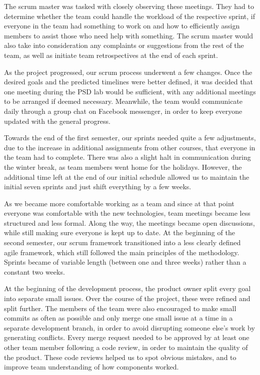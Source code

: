 \documentclass{l3proj}
\begin{document}
 The scrum master was tasked with closely observing these meetings. They had
  to determine whether the team could handle the workload of the respective
  sprint, if everyone in the team had something to work on and how to efficiently
  assign members to assist those who need help with something. The scrum
  master would also take into consideration any complaints or suggestions from
  the rest of the team, as well as initiate team retrospectives at the end of
  each sprint.

 As the project progressed, our scrum process underwent a few changes. Once
 the desired goals and the predicted timelines were better defined, it was
 decided that one meeting during the PSD lab would be sufficient, with any
 additional meetings to be arranged if deemed necessary. Meanwhile, the team
 would communicate daily through a group chat on Facebook messenger, in order
 to keep everyone updated with the general progress.

Towards the end of the first semester, our sprints needed quite a few
 adjustments, due to the increase in additional assignments from other
 courses, that everyone in the team had to complete. There was also a
 slight halt in communication during the winter break, as team members
 went home for the holidays. However, the additional time left at the
 end of our initial schedule allowed us to maintain the initial seven
 sprints and just shift everything by a few weeks.

As we became more comfortable working as a team and since at that
 point everyone was comfortable with the new technologies, team
 meetings became less structured and less formal. Along the way,
 the meetings became open discussions, while still making sure
 everyone is kept up to date. At the beginning of the second
 semester, our scrum framework transitioned into a less clearly
 defined agile framework, which still followed the main principles
 of the methodology. Sprints became of variable length (between
 one and three weeks) rather than a constant two weeks.

 

At the beginning of the development process, the product owner split
 every goal into separate small issues. Over the course of the project,
 these were refined and split further. The members of the team were
 also encouraged to make small commits as often as possible and only
 merge one small issue at a time in a separate development branch, in order
 to avoid disrupting someone else's work by generating conflicts.
 Every merge request needed to be approved by at least one other
 team member following a code review, in order to maintain the quality 
 of the product. These code reviews helped us to spot obvious mistakes,
 and to improve team understanding of how components worked.
\end{document}
